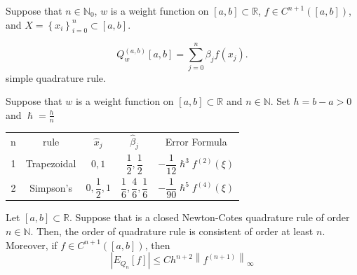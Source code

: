 \begin{frame}
    \begin{theorem}
        Suppose that $n\in\mathbb{N}_{0}$, $w$ is a weight function
        on $\left[a,b\right]\subset\mathbb{R}$,
        $f\in C^{n+1}\left(\left[a,b\right]\right)$, and
        $X=\left\{x_{i}\right\}_{i=0}^{n}\subset\left[a,b\right]$.
    \end{theorem}

    \begin{equation*}
        Q^{\left(a,b\right)}_{w}\left[a,b\right]=
        \sum\limits_{j=0}^{n}
        \beta_{j}f\left(x_{j}\right).
    \end{equation*}
    simple quadrature rule.

    \begin{definition}
        Suppose that $w$ is a weight function on
        $\left[a,b\right]\subset\mathbb{R}$ and $n\in\mathbb{N}$.
        Set $h=b-a>0$ and $\hslash=\frac{h}{n}$
    \end{definition}

    \begin{table}[ht!]
        \centering
        \begin{tabular}{ccccc}
            n & rule                                                          & $\widehat{x}_{j}$  & $\widehat{\beta}_{j}$
              & Error Formula                                                                                                                   \\
            1 & Trapezoidal                                                   & $0,1$              & $\dfrac{1}{2}, \dfrac{1}{2}$
              & $-\dfrac{1}{12}\hslash^{3}f^{\left(2\right)}\left(\xi\right)$                                                                   \\
            2 & Simpson's                                                     & $0,\dfrac{1}{2},1$ & $\dfrac{1}{6}, \dfrac{4}{6}, \dfrac{1}{6}$
              & $-\dfrac{1}{90}\hslash^{5}f^{\left(4\right)}\left(\xi\right)$
        \end{tabular}
    \end{table}

    \begin{theorem}
        Let $\left[a,b\right]\subset\mathbb{R}$.
        Suppose that is a closed Newton-Cotes quadrature rule of order $n\in\mathbb{N}$.
        Then, the order of quadrature rule is consistent of order at least $n$.
        Moreover, if $f\in C^{n+1}\left(\left[a,b\right]\right)$, then
        \begin{equation*}
            \left|E_{Q_{n}}\left[f\right]\right|\leq
            C h^{n+2}{\left\|f^{\left(n+1\right)}\right\|}_{\infty}
        \end{equation*}
    \end{theorem}


\end{frame}
